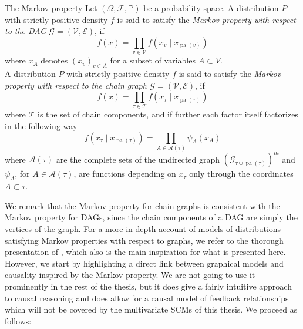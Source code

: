 \documentclass[11pt, a4paper]{memoir}
\theoremstyle{break}
\theoremstyle{break}
\theoremstyle{nonumberplain}
\newcommand{\mP}{\mathbb{P}}
\DeclareMathOperator{\pa}{pa}
\begin{document}
\begin{mydefinition}{The Markov property}\label{Markov}
Let $(\Omega, \mathcal{F}, \mP)$ be a probability space. A distribution $P$ with strictly positive density $f$ is said to satisfy the \emph{Markov property with respect to the DAG} $\mathcal{G}=(\mathcal{V}, \mathcal{E})$, if
\begin{equation}\label{MPDAG}
f(x)=\prod_{v\in \mathcal{V}}f\left(x_v\mid x_{\pa(v)}\right)
\end{equation}
where $x_A$ denotes $(x_v)_{v\in A}$ for a subset of variables $A\subset V$.\\[5pt]
A distribution $P$ with strictly positive density $f$ is said to satisfy the \emph{Markov property with respect to the chain graph} $\mathcal{G}=(\mathcal{V}, \mathcal{E})$, if
\begin{equation}\label{MPCHAIN}
 f(x)=\prod_{\tau\in \mathscr{T}}f\left(x_\tau\mid x_{\pa(\tau)}\right)
\end{equation}
where $\mathscr{T}$ is the set of chain components, and if further each factor itself factorizes in the following way
$$f\left(x_\tau\mid x_{\pa(\tau)}\right)=\prod_{A\in \mathscr{A}(\tau)}\psi_A\left(x_A\right)$$
where $\mathscr{A}(\tau)$ are the complete sets of the undirected graph $\left(\mathcal{G}_{\tau\cup\pa(\tau)}\right)^m$ and $\psi_A$, for $A\in \mathscr{A}(\tau)$, are functions depending on $x_\tau$ only through the coordinates $A\subset \tau$. 
\end{mydefinition}
We remark that the Markov property for chain graphs is consistent with the Markov property for DAGs, since the chain components of a DAG are simply the vertices of the graph. For a more in-depth account of models of distributions satisfying Markov properties with respect to graphs, we refer to the thorough presentation of \cite{Steffen}, which also is the main inspiration for what is presented here. However, we start by highlighting a direct link between graphical models and causality inspired by the Markov property. We are not going to use it prominently in the rest of the thesis, but it does give a fairly intuitive approach to causal reasoning and does allow for a causal model of feedback relationships which will not be covered by the multivariate SCMs of this thesis. We proceed as follows:
\end{document}
